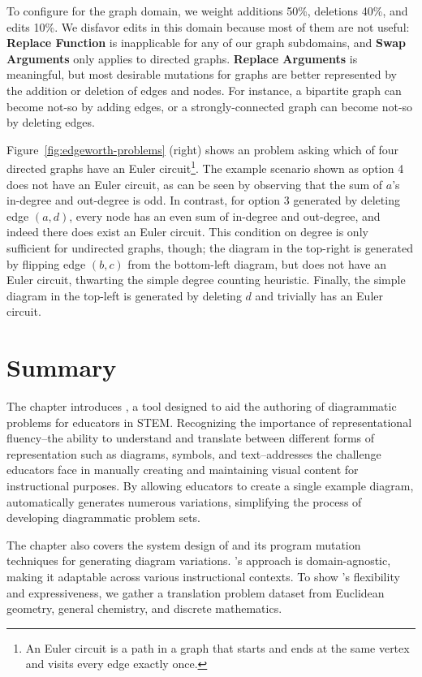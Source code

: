 To configure \Edgeworth for the graph domain, we weight additions 50\%, deletions 40\%, and edits 10\%. We disfavor edits in this domain because most of them are not useful: \textbf{Replace Function} is inapplicable for any of our graph subdomains, and \textbf{Swap Arguments} only applies to directed graphs. \textbf{Replace Arguments} is meaningful, but most desirable mutations for graphs are better represented by the addition or deletion of edges and nodes. For instance, a bipartite graph can become not-so by adding edges, or a strongly-connected graph can become not-so by deleting edges. 

Figure~\ref{fig:edgeworth-problems} (right) shows an \Edgeworth problem asking which of four directed graphs have an Euler circuit\footnote{An Euler circuit is a path in a graph that starts and ends at the same vertex and visits every edge exactly once.}. The example scenario shown as option 4 does not have an Euler circuit, as can be seen by observing that the sum of $a$'s in-degree and out-degree is odd. In contrast, for option 3 generated by deleting edge $(a, d)$, every node has an even sum of in-degree and out-degree, and indeed there does exist an Euler circuit. This condition on degree is only sufficient for undirected graphs, though; the diagram in the top-right is generated by flipping edge $(b, c)$ from the bottom-left diagram, but does not have an Euler circuit, thwarting the simple degree counting heuristic. Finally, the simple diagram in the top-left is generated by deleting $d$ and trivially has an Euler circuit. 

\section{Summary}

The chapter introduces \Edgeworth, a tool designed to aid the authoring of diagrammatic problems for educators in STEM. Recognizing the importance of representational fluency--the ability to understand and translate between different forms of representation such as diagrams, symbols, and text--\Edgeworth addresses the challenge educators face in manually creating and maintaining visual content for instructional purposes. By allowing educators to create a single example diagram, \Edgeworth automatically generates numerous variations, simplifying the process of developing diagrammatic problem sets. 

The chapter also covers the system design of \Edgeworth{} and its program mutation techniques for generating diagram variations. \Edgeworth's approach is domain-agnostic, making it adaptable across various instructional contexts. To show \Edgeworth's flexibility and expressiveness, we gather a translation problem dataset from Euclidean geometry, general chemistry, and discrete mathematics.


